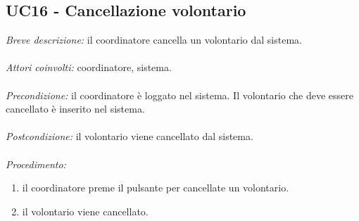 \subsection{UC16 - Cancellazione volontario}
\textit{Breve descrizione:} il coordinatore cancella un volontario dal sistema. 
\\
\\
\textit{Attori coinvolti:} coordinatore, sistema.
\\
\\
\textit{Precondizione:} il coordinatore è loggato nel sistema.
Il volontario che deve essere cancellato è inserito nel sistema.
\\
\\
\textit{Postcondizione:} il volontario viene cancellato dal sistema.
\\
\\
\textit{Procedimento:}
\begin{enumerate}
	\item il coordinatore preme il pulsante per cancellate un volontario.
	\item il volontario viene cancellato.
\end{enumerate}

